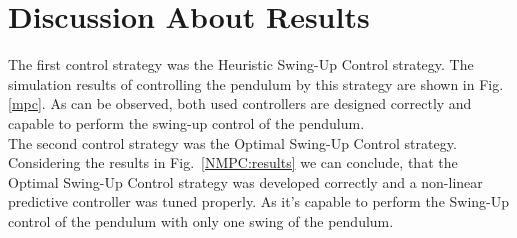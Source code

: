 \section{Discussion About Results}
The first control strategy was the Heuristic Swing-Up Control strategy. The simulation results of controlling the pendulum by this strategy are shown in Fig.\ref{mpc}. As can be observed, both used controllers are designed correctly and capable to perform the swing-up control of the pendulum. \\

The second control strategy was the Optimal Swing-Up Control strategy. Considering the results in Fig.~\ref{NMPC:results} we can conclude, that the Optimal Swing-Up Control strategy was developed correctly and a non-linear predictive controller was tuned properly. As it's capable to perform the Swing-Up control of the pendulum with only one swing of the pendulum.\\

